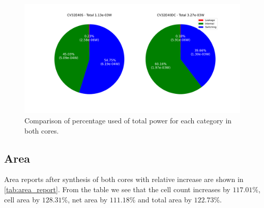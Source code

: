 \begin{figure}[h!]
    \centering
    \includegraphics[width=\textwidth]{docs/images/power_compare_pie.png}
    \caption{Comparison of percentage used of total power for each category in both cores.}
    \label{fig:compare_power_pie}
\end{figure}

\subsection{Area}

Area reports after synthesis of both cores with relative increase are shown in \autoref{tab:area_report}. From the table we see that the cell count increases by $117.01\%$, cell area by $128.31\%$, net area by $111.18\%$ and total area by $122.73\%$. 
\clearpage

\begin{table}[h!]
\centering
\caption{Area report for CV32E40S.}
\label{tab:area_report}
\end{table}


